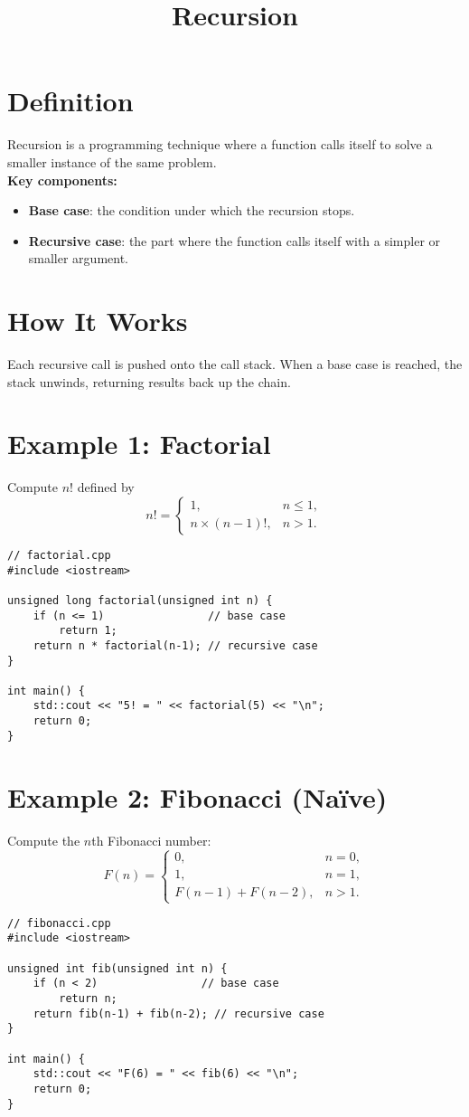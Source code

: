 \documentclass{article}
\title{Recursion}
\author{}
\date{}
\begin{document}
\maketitle

\section{Definition}
Recursion is a programming technique where a function calls itself to solve a smaller instance of the same problem.\\
\textbf{Key components:}
\begin{itemize}
  \item \textbf{Base case}: the condition under which the recursion stops.
  \item \textbf{Recursive case}: the part where the function calls itself with a simpler or smaller argument.
\end{itemize}

\section{How It Works}
Each recursive call is pushed onto the call stack. When a base case is reached, the stack unwinds, returning results back up the chain.

\section{Example 1: Factorial}
Compute \(n!\) defined by
\[
n! = 
\begin{cases}
1, & n \le 1,\\
n \times (n-1)!, & n > 1.
\end{cases}
\]
\begin{lstlisting}[style=cppstyle]
// factorial.cpp
#include <iostream>

unsigned long factorial(unsigned int n) {
    if (n <= 1)                // base case
        return 1;
    return n * factorial(n-1); // recursive case
}

int main() {
    std::cout << "5! = " << factorial(5) << "\n";
    return 0;
}
\end{lstlisting}

\section{Example 2: Fibonacci (Naïve)}
Compute the \(n\)th Fibonacci number:
\[
F(n) = 
\begin{cases}
0, & n = 0,\\
1, & n = 1,\\
F(n-1) + F(n-2), & n > 1.
\end{cases}
\]
\begin{lstlisting}[style=cppstyle]
// fibonacci.cpp
#include <iostream>

unsigned int fib(unsigned int n) {
    if (n < 2)                // base case
        return n;
    return fib(n-1) + fib(n-2); // recursive case
}

int main() {
    std::cout << "F(6) = " << fib(6) << "\n";
    return 0;
}
\end{lstlisting}
\end{document}
